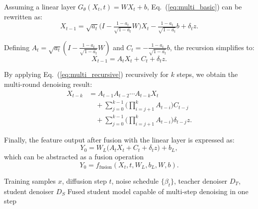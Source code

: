 \documentclass[conference]{IEEEtran}
\begin{document}
{Assuming a linear layer $G_\theta(X_t,t) = W X_t + b$, Eq.~(\ref{eq:multi_basic}) can be rewritten as:  
\begin{equation}
X_{t-1} = \sqrt{a_t}\Big(I - \tfrac{1-a_t}{\sqrt{1-\bar{a_t}}} W \Big)X_t - \tfrac{1-a_t}{\sqrt{1-\bar{a_t}}} b + \delta_t z.
\label{eq:multi_affine}
\end{equation}

Defining $A_t = \sqrt{a_t}(I - \tfrac{1-a_t}{\sqrt{1-\bar{a_t}}}W)$ and $C_t = -\tfrac{1-a_t}{\sqrt{1-\bar{a_t}}}b$, the recursion simplifies to:  
\begin{equation}
X_{t-1} = A_t X_t + C_t + \delta_t z.
\label{eq:multi_recursive}
\end{equation}

By applying Eq.~(\ref{eq:multi_recursive}) recursively for $k$ steps, we obtain the multi-round denoising result:  
\begin{equation}
\begin{aligned}
X_{t-k} &= A_{t-1} A_{t-2} \cdots A_{t-k} X_t  \\
&\quad + \sum_{j=0}^{k-1} \Big( \prod_{i=j+1}^{k} A_{t-i} \Big) C_{t-j}  \\
&\quad + \sum_{j=0}^{k-1} \Big( \prod_{i=j+1}^{k} A_{t-i} \Big) \delta_{t-j} z .
\end{aligned}
\label{eq:multi_kstep}
\end{equation}

Finally, the feature output after fusion with the linear layer is expressed as:  
\begin{equation}
Y_0 = W_L \big( A_t X_t + C_t + \delta_t z \big) + b_L ,
\label{eq:multi_output}
\end{equation}
which can be abstracted as a fusion operation
\begin{equation}
Y_0 = f_{\text{fusion}}(X_t, t, W_L, b_L, W, b).
\label{eq:fusion_func}
\end{equation}



\begin{algorithm}[t]
\caption{Multi-step Denoising Fusion}
\label{alg:multi_step_fusion}
\renewcommand{\algorithmicrequire}{\textbf{Input:}}
\renewcommand{\algorithmicensure}{\textbf{Output:}}
\begin{algorithmic}[1]

\Require Training samples $x$, diffusion step $t$, noise schedule $\{\beta_t\}$,
teacher denoiser $D_T$, student denoiser $D_S$
\Ensure Fused student model capable of multi-step denoising in one step


\end{algorithmic}
\end{algorithm}}
\end{document}
